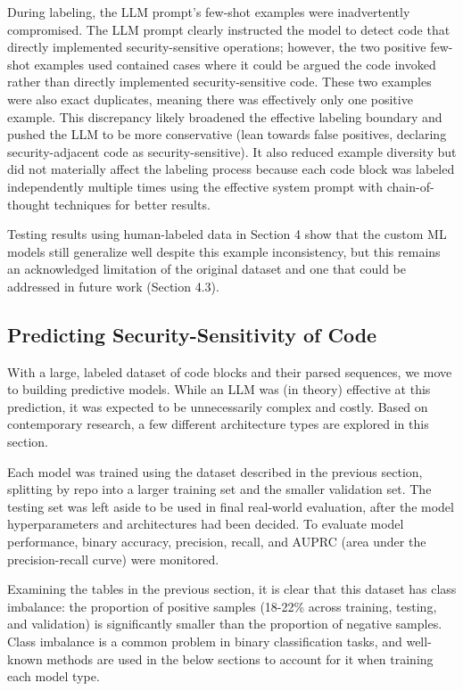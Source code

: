 \documentclass[11pt]{article}
\begin{document}
During labeling, the LLM prompt's few-shot examples were inadvertently
compromised. The LLM prompt clearly instructed the model to detect code
that directly implemented security-sensitive operations; however, the
two positive few-shot examples used contained cases where it could be
argued the code invoked rather than directly implemented
security-sensitive code. These two examples were also exact duplicates, meaning there was effectively only one positive example.
This discrepancy likely broadened the effective labeling boundary and
pushed the LLM to be more conservative (lean towards false positives,
declaring security-adjacent code as security-sensitive). It also reduced
example diversity but did not materially affect the labeling process
because each code block was labeled independently multiple times using
the effective system prompt with chain-of-thought techniques for better
results.

Testing results using human-labeled data in Section 4 show that the
custom ML models still generalize well despite this example
inconsistency, but this remains an acknowledged limitation of the
original dataset and one that could be addressed in future work (Section 4.3).

\subsection{Predicting Security-Sensitivity of Code}\label{predicting-security-sensitivity-of-code}

With a large, labeled dataset of code blocks and their parsed sequences,
we move to building predictive models. While an LLM was (in
theory) effective at this prediction, it was expected to be unnecessarily complex and costly. Based on contemporary research,
a few different architecture types are explored in
this section.

Each model was trained using the dataset described in the previous
section, splitting by repo into a larger training set and the smaller
validation set. The testing set was left aside to be used in final
real-world evaluation, after the model hyperparameters and architectures
had been decided. To evaluate model performance, binary
accuracy, precision, recall, and AUPRC (area under the precision-recall
curve) were monitored.

Examining the tables in the previous section, it is clear that this dataset has class
imbalance: the proportion of positive samples (18-22\% across training,
testing, and validation) is significantly smaller than the proportion of
negative samples. Class imbalance is a common problem in binary
classification tasks, and well-known methods are used in the below sections
to account for it when training each model type.
\end{document}
